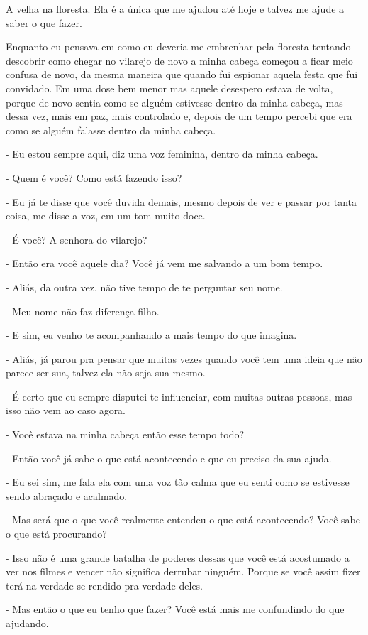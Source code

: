 A velha na floresta. Ela é a única que me ajudou até hoje e talvez me ajude a saber o que fazer.

Enquanto eu pensava em como eu deveria me embrenhar pela floresta tentando descobrir como chegar no vilarejo de novo a minha cabeça começou a ficar meio confusa de novo, da mesma maneira que quando fui espionar aquela festa que fui convidado. Em uma dose bem menor mas aquele desespero estava de volta, porque de novo sentia como se alguém estivesse dentro da minha cabeça, mas dessa vez, mais em paz, mais controlado e, depois de um tempo percebi que era como se alguém falasse dentro da minha cabeça.

- Eu estou sempre aqui, diz uma voz feminina, dentro da minha cabeça.

- Quem é você? Como está fazendo isso?

- Eu já te disse que você duvida demais, mesmo depois de ver e passar por tanta coisa, me disse a voz, em um tom muito doce.

- É você? A senhora do vilarejo?

- Então era você aquele dia? Você já vem me salvando a um bom tempo.

- Aliás, da outra vez, não tive tempo de te perguntar seu nome.

- Meu nome não faz diferença filho.

- E sim, eu venho te acompanhando a mais tempo do que imagina.

- Aliás, já parou pra pensar que muitas vezes quando você tem uma ideia que não parece ser sua, talvez ela não seja sua mesmo.

- É certo que eu sempre disputei te influenciar, com muitas outras pessoas, mas isso não vem ao caso agora.

- Você estava na minha cabeça então esse tempo todo?

- Então você já sabe o que está acontecendo e que eu preciso da sua ajuda.

- Eu sei sim, me fala ela com uma voz tão calma que eu senti como se estivesse sendo abraçado e acalmado.

- Mas será que o que você realmente entendeu o que está acontecendo? Você sabe o que está procurando?

- Isso não é uma grande batalha de poderes dessas que você está acostumado a ver nos filmes e vencer não significa derrubar ninguém. Porque se você assim fizer terá na verdade se rendido pra verdade deles.

- Mas então o que eu tenho que fazer? Você está mais me confundindo do que ajudando.


